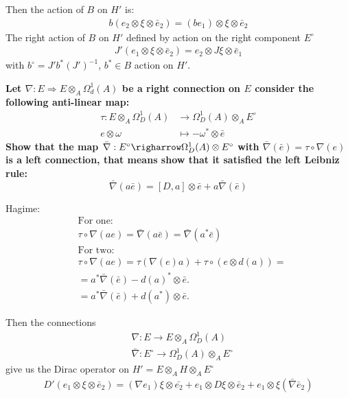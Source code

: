 \documentclass[a4paper]{article}
\newcounter{exercise}
\newenvironment{MyExercise}%
{\begin{mdframed}[style=exercisestyle]}{\end{mdframed}}
\theoremstyle{definition}
\theoremstyle{definition}
\theoremstyle{definition}
\theoremstyle{theorem}
\theoremstyle{theorem}
\begin{document}
Then the action of $B$ on $H'$ is:
\begin{align}
    b(e_2 \otimes \xi \otimes \bar{e}_2 ) = (be_1) \otimes \xi \otimes
    \bar{e}_2
\end{align}
The right action of $B$ on $H'$ defined by action on the right component
$E^\circ$
\begin{align}
    J'(e_1 \otimes \xi \otimes \bar{e}_2) = e_2 \otimes J \xi \otimes
    \bar{e}_1
\end{align}
with $b^\circ = J' b^* (J')^{-1}$, $b^* \in B$ action on $H'$.
\newline


\newpage
\begin{MyExercise}
    \textbf{ Let $\nabla : E \Rightarrow E \otimes _A \Omega _d^1 (A)$ be a right connection on $E$
    consider the following anti-linear map:
    \begin{align}
        \tau : E \otimes_A \Omega _D^1 (A) &\rightarrow \Omega _D^1 (A) \otimes_A E^\circ\\
                e \otimes \omega &\mapsto -\omega ^* \otimes \bar{e}
    \end{align}
    Show that the map $\bar{\nabla} : E^\circ \righarrow \Omega _D^1(A) \otimes E^\circ$
    with $\bar{\nabla}(\bar{e}) = \tau \circ \nabla(e)$ is a left connection, that means
    show that it satisfied the left Leibniz rule:
    \begin{equation}
        \bar{\nabla}(a\bar{e}) = [D, a] \otimes \bar{e} + a \bar{\nabla}(\bar{e})
    \end{equation}
    }\newline


    Hagime:
    \begin{align}
        &\text{For one:}\\
        &\tau \circ \nabla(ae) = \bar{\nabla}(a\bar{e}) = \bar{\nabla}(a^* \bar{e})\\
        &\text{For two:}\\
         &\tau \circ \nabla(ae) = \tau(\nabla(e)a) + \tau \circ(e \otimes d(a))=\\
         &=a^*\bar{\nabla}(\bar{e}) - d(a)^* \otimes \bar{e}. \\
         &= a^*\bar{\nabla}(\bar{e}) + d(a^*) \otimes \bar{e}.
    \end{align}
\end{MyExercise}
Then the connections
\begin{align}
    &\nabla: E \rightarrow E\otimes _A \Omega _D ^1(A) \\
    &\bar{\nabla}:E^\circ \rightarrow \Omega _D^1(A) \otimes _A E^\circ
\end{align}
give us the Dirac operator on $H' = E \otimes _A H \otimes _A E^\circ$
\begin{align}
    D'(e_1 \otimes \xi \otimes \bar{e}_2) = (\nabla e_1) \xi \otimes
    \bar{e_2}+ e_1 \otimes D\xi \otimes \bar{e}_2 + e_1 \otimes
    \xi(\bar{\nabla}\bar{e}_2)
\end{align}
\end{document}
